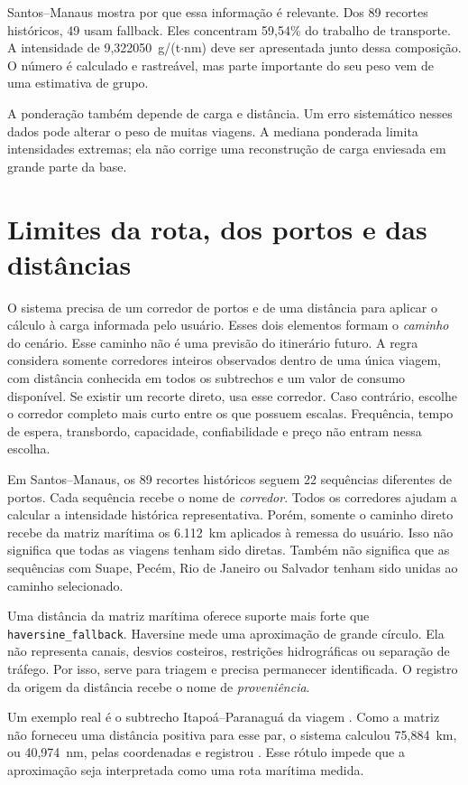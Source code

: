 Santos--Manaus mostra por que essa informação é relevante. Dos 89 recortes históricos, 49 usam fallback. Eles concentram 59,54\% do trabalho de transporte. A intensidade de 9,322050~g/(t$\cdot$nm) deve ser apresentada junto dessa composição. O número é calculado e rastreável, mas parte importante do seu peso vem de uma estimativa de grupo.

A ponderação também depende de carga e distância. Um erro sistemático nesses dados pode alterar o peso de muitas viagens. A mediana ponderada limita intensidades extremas; ela não corrige uma reconstrução de carga enviesada em grande parte da base.

\section{Limites da rota, dos portos e das distâncias}
\label{sec:limitacao-rota}

O sistema precisa de um corredor de portos e de uma distância para aplicar o cálculo à carga informada pelo usuário. Esses dois elementos formam o \emph{caminho} do cenário. Esse caminho não é uma previsão do itinerário futuro. A regra considera somente corredores inteiros observados dentro de uma única viagem, com distância conhecida em todos os subtrechos e um valor de consumo disponível. Se existir um recorte direto, usa esse corredor. Caso contrário, escolhe o corredor completo mais curto entre os que possuem escalas. Frequência, tempo de espera, transbordo, capacidade, confiabilidade e preço não entram nessa escolha.

Em Santos--Manaus, os 89 recortes históricos seguem 22 sequências diferentes de portos. Cada sequência recebe o nome de \emph{corredor}. Todos os corredores ajudam a calcular a intensidade histórica representativa. Porém, somente o caminho direto recebe da matriz marítima os 6.112~km aplicados à remessa do usuário. Isso não significa que todas as viagens tenham sido diretas. Também não significa que as sequências com Suape, Pecém, Rio de Janeiro ou Salvador tenham sido unidas ao caminho selecionado.

Uma distância da matriz marítima oferece suporte mais forte que \texttt{haversine\_fallback}. Haversine mede uma aproximação de grande círculo. Ela não representa canais, desvios costeiros, restrições hidrográficas ou separação de tráfego. Por isso, serve para triagem e precisa permanecer identificada. O registro da origem da distância recebe o nome de \emph{proveniência}.

Um exemplo real é o subtrecho Itapoá--Paranaguá da viagem . Como a matriz não forneceu uma distância positiva para esse par, o sistema calculou 75,884~km, ou 40,974~nm, pelas coordenadas e registrou . Esse rótulo impede que a aproximação seja interpretada como uma rota marítima medida.

